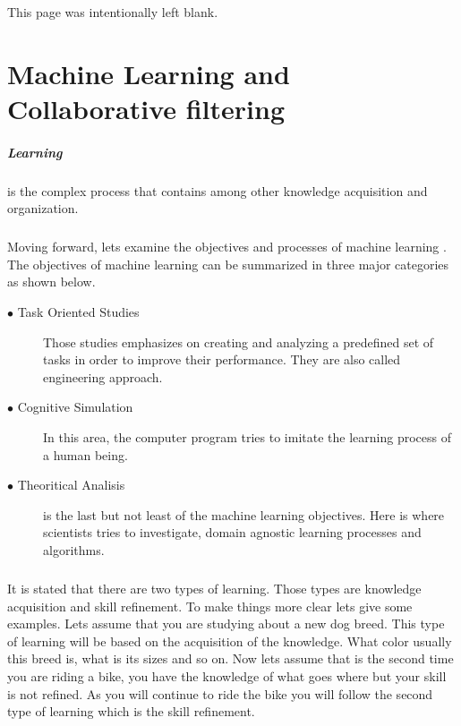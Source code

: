 \newpage
\begin{center}
	This page was intentionally left blank.
\end{center}
\newpage
\chapter{Machine Learning and Collaborative filtering}
\paragraph{Learning} is the complex process that contains among other knowledge acquisition and organization.

\paragraph{}Moving forward, lets examine the objectives and processes of machine learning \cite{carbonell1983overview}. The objectives of machine learning can be summarized in three major categories as shown below.

\begin{description}
	\item[$\bullet$ Task Oriented Studies] Those studies emphasizes on creating and analyzing a predefined set of tasks in order to improve their performance. They are also called engineering approach.
	\item[$\bullet$ Cognitive Simulation] In this area, the computer program tries to imitate the learning process of a human being.
	\item[$\bullet$ Theoritical Analisis] is the last but not least of the machine learning objectives. Here is where scientists tries to investigate, domain agnostic learning processes and algorithms.
\end{description}

\paragraph{} It is stated that there are two types of learning. Those types are knowledge acquisition and skill refinement. To make things more clear lets give some examples. Lets assume that you are studying about a new dog breed. This type of learning will be based on the acquisition of the knowledge. What color usually this breed is, what is its sizes and so on. Now lets assume that is the second time you are riding a bike, you have the knowledge of what goes where but your skill is not refined. As you will continue to ride the bike you will follow the second type of learning which is the skill refinement.


